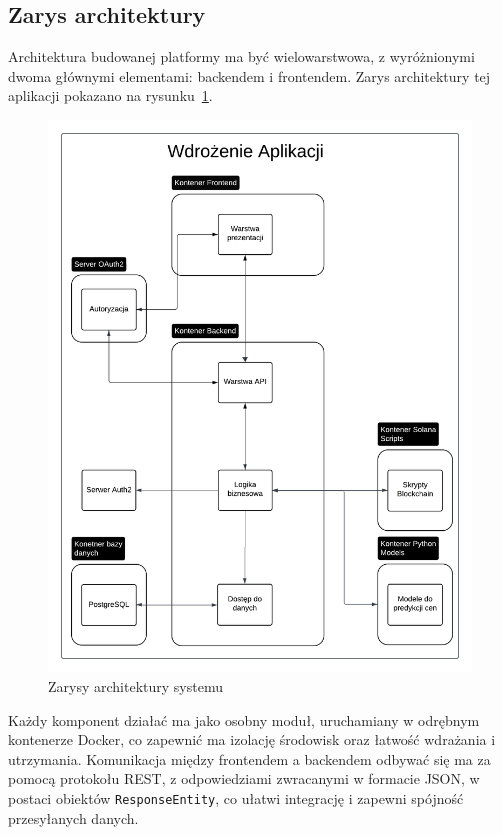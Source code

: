 \subsection{Zarys architektury}\label{subsec:ZarysArchitektury}
Architektura budowanej platformy ma być wielowarstwowa, z wyróżnionymi dwoma głównymi elementami: backendem i frontendem. 
Zarys architektury tej aplikacji pokazano na rysunku~\ref{fig:ZarysyArchitekturySystemu}.
\begin{figure}[htb]
    \centering
    \includegraphics[width=0.9\linewidth]{Diagram.png} %
    \caption{Zarysy architektury systemu}
    \label{fig:ZarysyArchitekturySystemu}
\end{figure}
Każdy komponent działać ma jako osobny moduł, uruchamiany w odrębnym kontenerze Docker, co zapewnić ma izolację środowisk oraz łatwość wdrażania i utrzymania. Komunikacja między frontendem a backendem odbywać się ma za pomocą protokołu REST, z odpowiedziami zwracanymi w formacie JSON, w postaci obiektów \texttt{ResponseEntity}, co ułatwi integrację i zapewni spójność przesyłanych danych.

